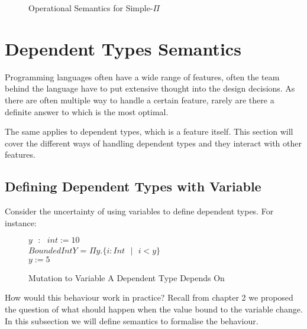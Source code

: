 \documentclass[a4paper,12pt]{report}
\begin{document}
\begin{figure}[H]
\begin{center}
  \end{center}
  \caption{Operational Semantics for Simple-$\Pi$}
\end{figure}

\section{Dependent Types Semantics}
Programming languages often have a wide range of features, often the team behind 
the language have to put extensive thought into the design decisions. As there 
are often multiple way to handle a certain feature, rarely are there a definite 
answer to which is the most optimal.

\par
The same applies to dependent types, which is a feature itself. This section 
will cover the different ways of handling dependent types and they interact with 
other features.

\subsection{Defining Dependent Types with Variable}
Consider the uncertainty of using variables to define dependent types. For 
instance: 

\begin{figure} [H]
  \begin{center}
    $y\text{ }:\text{ }int := 10$ \\
    $BoundedIntY$ = $\Pi y. \{i : Int\text{ }|\text{ }i < y\}$ \\ 
    $y := 5$
  \end{center}
  \caption{Mutation to Variable A Dependent Type Depends On}
\end{figure}
\par
How would this behaviour work in practice? Recall from chapter 2 we proposed the 
question of what should happen when the value bound to the variable change. In 
this subsection we will define semantics to formalise the behaviour.
\end{document}
